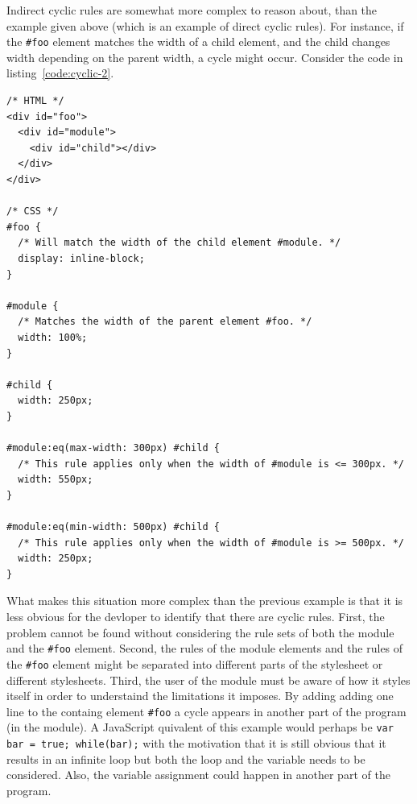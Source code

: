 \documentclass[a4paper,11pt]{kth-mag}
\newcommand{\code}[1]{\texttt{#1}}
\begin{document}
          Indirect cyclic rules are somewhat more complex to reason about, than the example given above (which is an example of direct cyclic rules).
          For instance, if the \code{\#foo} \gls{element} matches the width of a child \gls{element}, and the child changes width depending on the parent width, a cycle might occur.
          Consider the code in listing~\ref{code:cyclic-2}.
          
          \begin{lstlisting}[caption={Example of indirect cyclic rules. Here the user (\code{\#foo}) of the module (\code{\#module}) creates cyclic rules indirectly by specifying that it should match the width of the module.}, captionpos=b, label={code:cyclic-2}]
/* HTML */
<div id="foo">
  <div id="module">
    <div id="child"></div>
  </div>
</div>

/* CSS */
#foo {
  /* Will match the width of the child element #module. */
  display: inline-block;
}

#module {
  /* Matches the width of the parent element #foo. */
  width: 100%;
}

#child {
  width: 250px;
}

#module:eq(max-width: 300px) #child {
  /* This rule applies only when the width of #module is <= 300px. */
  width: 550px;
}

#module:eq(min-width: 500px) #child {
  /* This rule applies only when the width of #module is >= 500px. */
  width: 250px;
}
          \end{lstlisting}
          What makes this situation more complex than the previous example is that it is less obvious for the devloper to identify that there are cyclic rules.
          First, the problem cannot be found without considering the rule sets of both the module and the \code{\#foo} element.
          Second, the rules of the module elements and the rules of the \code{\#foo} \gls{element} might be separated into different parts of the stylesheet or different stylesheets.
          Third, the user of the module must be aware of how it styles itself in order to understaind the limitations it imposes.
          By adding adding one line to the containg element \code{\#foo} a cycle appears in another part of the program (in the module).
          A \gls{JavaScript} quivalent of this example would perhaps be \code{var bar = true; while(bar);} with the motivation that it is still obvious that it results in an infinite loop but both the loop and the variable needs to be considered.
          Also, the variable assignment could happen in another part of the program.
\end{document}
